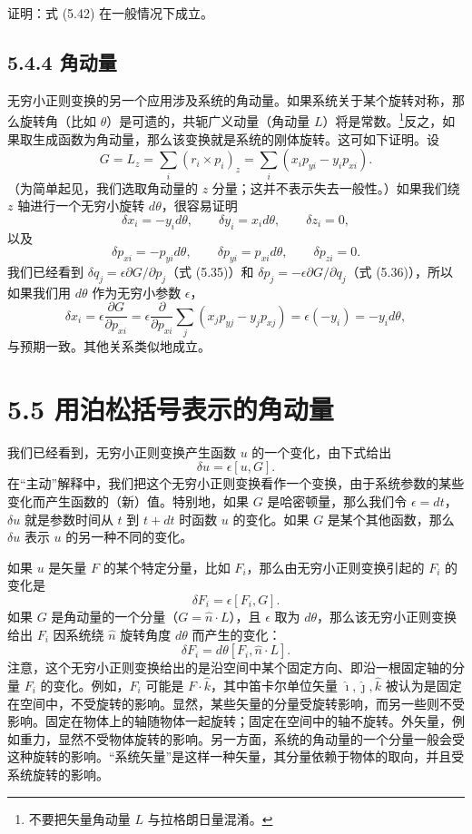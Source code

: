 \begin{exercise}
证明：式 (5.42) 在一般情况下成立。
\end{exercise}

\subsection*{5.4.4 角动量}

无穷小正则变换的另一个应用涉及系统的角动量。如果系统关于某个旋转对称，那么旋转角（比如 $\theta$）是可遗的，共轭广义动量（角动量 $L$）将是常数。\footnote{不要把矢量角动量 $L$ 与拉格朗日量混淆。}反之，如果取生成函数为角动量，那么该变换就是系统的刚体旋转。这可如下证明。设
$$
G = L_z = \sum_i (r_i \times p_i)_z = \sum_i (x_i p_{yi} - y_i p_{xi}).
$$
（为简单起见，我们选取角动量的 $z$ 分量；这并不表示失去一般性。）如果我们绕 $z$ 轴进行一个无穷小旋转 $d\theta$，很容易证明
$$
\delta x_i = -y_i d\theta, \qquad \delta y_i = x_i d\theta, \qquad \delta z_i = 0,
$$
以及
$$
\delta p_{xi} = -p_{yi} d\theta, \qquad \delta p_{yi} = p_{xi} d\theta, \qquad \delta p_{zi} = 0.
$$
我们已经看到 $\delta q_j = \epsilon \partial G/\partial p_j$（式 (5.35)）和 $\delta p_j = -\epsilon \partial G/\partial q_j$（式 (5.36)），所以如果我们用 $d\theta$ 作为无穷小参数 $\epsilon$，
$$
\delta x_i = \epsilon\frac{\partial G}{\partial p_{xi}}
= \epsilon\frac{\partial}{\partial p_{xi}}\sum_j (x_j p_{yj} - y_j p_{xj})
= \epsilon(-y_i) = -y_i d\theta,
$$
与预期一致。其他关系类似地成立。

\section*{5.5 用泊松括号表示的角动量}

我们已经看到，无穷小正则变换产生函数 $u$ 的一个变化，由下式给出
$$
\delta u = \epsilon[u, G].
$$
在“主动”解释中，我们把这个无穷小正则变换看作一个变换，由于系统参数的某些变化而产生函数的（新）值。特别地，如果 $G$ 是哈密顿量，那么我们令 $\epsilon = dt$，$\delta u$ 就是参数时间从 $t$ 到 $t + dt$ 时函数 $u$ 的变化。如果 $G$ 是某个其他函数，那么 $\delta u$ 表示 $u$ 的另一种不同的变化。

如果 $u$ 是矢量 $F$ 的某个特定分量，比如 $F_i$，那么由无穷小正则变换引起的 $F_i$ 的变化是
$$
\delta F_i = \epsilon[F_i, G].
$$
如果 $G$ 是角动量的一个分量（$G = \hat{n}\cdot L$），且 $\epsilon$ 取为 $d\theta$，那么该无穷小正则变换给出 $F_i$ 因系统绕 $\hat{n}$ 旋转角度 $d\theta$ 而产生的变化：
$$
\delta F_i = d\theta[F_i, \hat{n}\cdot L].
$$
注意，这个无穷小正则变换给出的是沿空间中某个固定方向、即沿一根固定轴的分量 $F_i$ 的变化。例如，$F_i$ 可能是 $F\cdot\hat{k}$，其中笛卡尔单位矢量 $\hat{\imath}, \hat{\jmath}, \hat{k}$ 被认为是固定在空间中，不受旋转的影响。显然，某些矢量的分量受旋转影响，而另一些则不受影响。固定在物体上的轴随物体一起旋转；固定在空间中的轴不旋转。外矢量，例如重力，显然不受物体旋转的影响。另一方面，系统的角动量的一个分量一般会受这种旋转的影响。“系统矢量”是这样一种矢量，其分量依赖于物体的取向，并且受系统旋转的影响。

